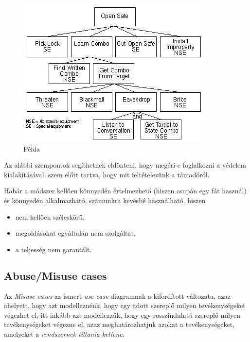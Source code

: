 \begin{figure}[h]
    \includegraphics[height=0.4\textheight]{figures/attacktrees.png}
    \centering
    \caption{Példa }
\end{figure}

Az alábbi szempontok segíthetnek eldönteni, hogy megéri-e foglalkozni a védelem kialakításával,
szem előtt tartva, hogy mit feltételezünk a támadóról.

Habár a módszer kellően könnyedén értelmezhető (hiszen csupán egy fát használ) és könnyedén
alkalmazható, számunkra kevésbé használható, hiszen
\begin{itemize}
    \item{nem kellően széleskörű,}
    \item{megoldásokat egyáltalán nem szolgáltat,}
    \item{a teljesség nem garantált.}
\end{itemize}

\subsection{Abuse/Misuse cases}

Az \emph{Misuse cases} az ismert \emph{use case} diagramnak a kifordított változata, azaz ahelyett,
hogy azt modelleznénk, hogy egy adott szereplő milyen tevékenységeket végezhet el, itt inkább azt
modellezzük, hogy egy rosszindulatú szereplő milyen tevékenységeket végezne el, azaz
meghatározhatjuk azokat a tevékenységeket, amelyeket a \emph{rendszernek tiltania kellene}.

